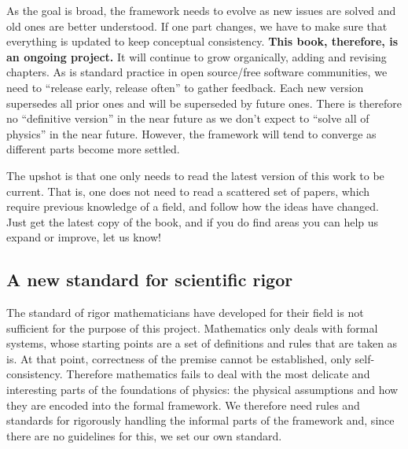 \documentclass[11pt,letterpaper,fleqn]{memoir} %
\begin{document}
As the goal is broad, the framework needs to evolve as new issues are solved and old ones are better understood. If one part changes, we have to make sure that everything is updated to keep conceptual consistency. \textbf{This book, therefore, is an ongoing project.} It will continue to grow organically, adding and revising chapters. As is standard practice in open source/free software communities, we need to ``release early, release often'' to gather feedback. Each new version supersedes all prior ones and will be superseded by future ones. There is therefore no ``definitive version'' in the near future as we don't expect to ``solve all of physics'' in the near future. However, the framework will tend to converge as different parts become more settled.

The upshot is that one only needs to read the latest version of this work to be current. That is, one does not need to read a scattered set of papers, which require previous knowledge of a field, and follow how the ideas have changed. Just get the latest copy of the book, and if you do find areas you can help us expand or improve, let us know!

\subsection{A new standard for scientific rigor}

The standard of rigor mathematicians have developed for their field is not sufficient for the purpose of this project. Mathematics only deals with formal systems, whose starting points are a set of definitions and rules that are taken as is. At that point, correctness of the premise cannot be established, only self-consistency. Therefore mathematics fails to deal with the most delicate and interesting parts of the foundations of physics: the physical assumptions and how they are encoded into the formal framework. We therefore need rules and standards for rigorously handling the informal parts of the framework and, since there are no guidelines for this, we set our own standard.
\end{document}
